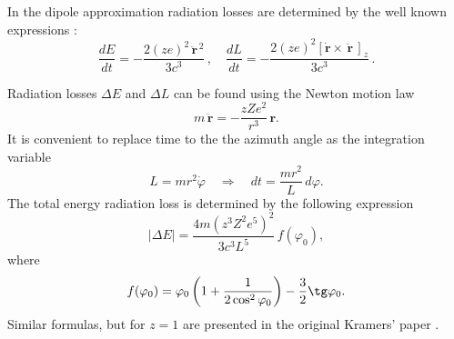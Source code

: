 \documentclass{SovJurn/JETPL}
\begin{document}
In the dipole approximation radiation losses are determined by the well known expressions \cite{landau1975classical}:
\begin{equation}
\label{2.6}
\frac{dE}{dt}=-\frac{2(ze)^2\,{\ddot{\mathbf{r}}}^{\,2}}{3c^3}\,,\quad
\frac{dL}{dt}=-\frac{2(ze)^2[\dot{\mathbf{r}}\times\, \ddot{\mathbf{r}}\,]_z}{3c^3}\,.
\end{equation}
\par Radiation losses $\Delta E$ and $\Delta L$ can be found using the Newton motion law
\begin{equation}
\label{2.7}
m\,\ddot{\!\mathbf{r}}=-\frac{zZe^2}{r^3}\,\mathbf{r}.
\end{equation}
It is convenient to replace time to the the azimuth angle as the integration variable
\begin{equation}
\label{2.4}
L=mr^2\dot\varphi
\quad\Rightarrow\quad
dt=\frac{mr^2}{L}\,d\varphi.
\end{equation}
The total energy radiation loss is determined by the following expression
\begin{equation}
\label{2.9}
|\Delta E|=\frac{4m(z^3Z^2e^5)^2}{3c^3L^5}\,f(\varphi_0),
\end{equation}
where
\begin{equation}
\label{2.9.2}
f(\varphi_0)=\varphi_0\left(1+\frac{1}{2\cos^2\varphi_0}\right)-\frac{3}{2}\tg\varphi_0.
\end{equation}
Similar formulas, but for $z=1$ are presented in the original Kramers' paper \cite{kramers1923xciii}.
\end{document}
